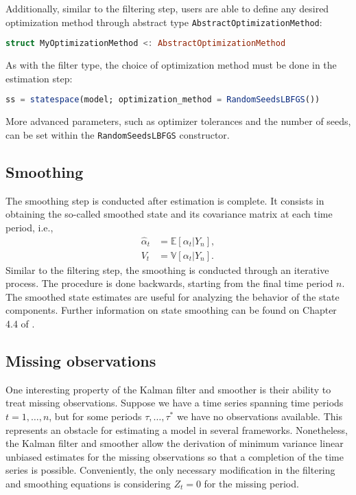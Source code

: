\documentclass{juliacon}
\begin{document}
Additionally, similar to the filtering step, users are able to define any desired optimization method through abstract type \texttt{AbstractOptimizationMethod}:
%
\begin{lstlisting}[language = Julia]
struct MyOptimizationMethod <: AbstractOptimizationMethod
\end{lstlisting}

As with the filter type, the choice of optimization method must be done in the estimation step:
%
\begin{lstlisting}[language = Julia]
ss = statespace(model; optimization_method = RandomSeedsLBFGS())
\end{lstlisting}

More advanced parameters, such as optimizer tolerances and the number of seeds, can be set within the \texttt{RandomSeedsLBFGS} constructor.

\subsection{Smoothing}

The smoothing step is conducted after estimation is complete. It consists in obtaining the so-called smoothed state and its covariance matrix at each time period, i.e.,
%
\begin{align}
    \hat{\alpha}_{t} &= \mathbb{E}[\alpha_{t} | Y_{n}], \\
    V_{t} &= \mathbb{V}[\alpha_{t} | Y_{n}].
\end{align}
%
Similar to the filtering step, the smoothing is conducted through an iterative process. The procedure is done backwards, starting from the final time period $n$. The smoothed state estimates are useful for analyzing the behavior of the state components. Further information on state smoothing can be found on Chapter 4.4 of \cite{durbin2012time}.

\subsection{Missing observations}

One interesting property of the Kalman filter and smoother is their ability to treat missing observations. Suppose we have a time series spanning time periods $t = 1, \dots, n$, but for some periods $\tau, \dots, \tau^{*}$ we have no observations available. This represents an obstacle for estimating a model in several frameworks. Nonetheless, the Kalman filter and smoother allow the derivation of minimum variance linear unbiased estimates for the missing observations so that a completion of the time series is possible. Conveniently, the only necessary modification in the filtering and smoothing equations is considering $Z_{t} = 0$ for the missing period.
\end{document}
